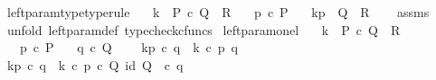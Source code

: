 \begin{isabellebody}
\isanewline
%
\endisadelimproof
\isanewline
{}\isamarkupfalse%
\ left{\isacharunderscore}{\kern0pt}param{\isacharunderscore}{\kern0pt}type{\isacharbrackleft}{\kern0pt}type{\isacharunderscore}{\kern0pt}rule{\isacharbrackright}{\kern0pt}{\isacharcolon}{\kern0pt}\isanewline
\ \ \ {\isachardoublequoteopen}k\ {\isacharcolon}{\kern0pt}\ P\ {\isasymtimes}\isactrlsub c\ Q\ {\isasymrightarrow}\ R{\isachardoublequoteclose}\isanewline
\ \ \ {\isachardoublequoteopen}p\ {\isasymin}\isactrlsub c\ P{\isachardoublequoteclose}\isanewline
\ \ \ {\isachardoublequoteopen}k\isactrlbsub {\isacharbrackleft}{\kern0pt}p{\isacharcomma}{\kern0pt}{\isacharminus}{\kern0pt}{\isacharbrackright}{\kern0pt}\isactrlesub \ {\isacharcolon}{\kern0pt}\ Q\ {\isasymrightarrow}\ R{\isachardoublequoteclose}\isanewline
%
\isadelimproof
\ \ %
\endisadelimproof
%
\isatagproof
{}\isamarkupfalse%
\ assms\ \isamarkupfalse%
\ {\isacharparenleft}{\kern0pt}unfold\ left{\isacharunderscore}{\kern0pt}param{\isacharunderscore}{\kern0pt}def{}{\isacharcomma}{\kern0pt}\ typecheck{\isacharunderscore}{\kern0pt}cfuncs{\isacharparenright}{\kern0pt}%
\endisatagproof
{\isafoldproof}%
%
\isadelimproof
\isanewline
%
\endisadelimproof
\isanewline
{}\isamarkupfalse%
\ left{\isacharunderscore}{\kern0pt}param{\isacharunderscore}{\kern0pt}on{\isacharunderscore}{\kern0pt}el{\isacharcolon}{\kern0pt}\isanewline
\ \ \ {\isachardoublequoteopen}k\ {\isacharcolon}{\kern0pt}\ P\ {\isasymtimes}\isactrlsub c\ Q\ {\isasymrightarrow}\ R{\isachardoublequoteclose}\isanewline
\ \ \ {\isachardoublequoteopen}p\ {\isasymin}\isactrlsub c\ P{\isachardoublequoteclose}\isanewline
\ \ \ {\isachardoublequoteopen}q\ {\isasymin}\isactrlsub c\ Q{\isachardoublequoteclose}\isanewline
\ \ \ \ {\isachardoublequoteopen}k\isactrlbsub {\isacharbrackleft}{\kern0pt}p{\isacharcomma}{\kern0pt}{\isacharminus}{\kern0pt}{\isacharbrackright}{\kern0pt}\isactrlesub \ {\isasymcirc}\isactrlsub c\ q\ {\isacharequal}{\kern0pt}\ k\ {\isasymcirc}\isactrlsub c\ {\isasymlangle}p{\isacharcomma}{\kern0pt}\ q{\isasymrangle}{\isachardoublequoteclose}\isanewline
%
\isadelimproof
%
\endisadelimproof
%
\isatagproof
{}\isamarkupfalse%
\ {\isacharminus}{\kern0pt}\ \isanewline
\ \ \isamarkupfalse%
\ {\isachardoublequoteopen}k\isactrlbsub {\isacharbrackleft}{\kern0pt}p{\isacharcomma}{\kern0pt}{\isacharminus}{\kern0pt}{\isacharbrackright}{\kern0pt}\isactrlesub \ {\isasymcirc}\isactrlsub c\ q\ {\isacharequal}{\kern0pt}\ k\ {\isasymcirc}\isactrlsub c\ {\isasymlangle}p\ {\isasymcirc}\isactrlsub c\ {\isasymbeta}\isactrlbsub Q\isactrlesub {\isacharcomma}{\kern0pt}\ id\ Q{\isasymrangle}\ \ {\isasymcirc}\isactrlsub c\ q{\isachardoublequoteclose}\isanewline

\end{isabellebody}
